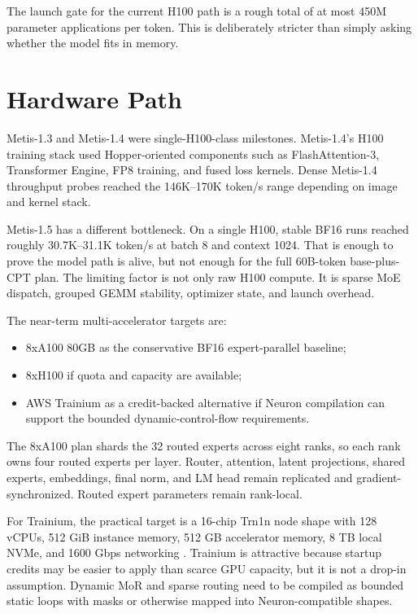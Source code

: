 \documentclass[11pt]{article}
\newcommand{\code}[1]{\texttt{\detokenize{#1}}}
\begin{document}
The launch gate for the current H100 path is a rough total of at most 450M
parameter applications per token. This is deliberately stricter than simply
asking whether the model fits in memory.

\section{Hardware Path}

Metis-1.3 and Metis-1.4 were single-H100-class milestones. Metis-1.4's H100
training stack used Hopper-oriented components such as FlashAttention-3,
Transformer Engine, FP8 training, and fused loss kernels. Dense Metis-1.4
throughput probes reached the 146K--170K token/s range depending on image and
kernel stack.

Metis-1.5 has a different bottleneck. On a single H100, stable BF16
\code{torch_grouped_safe} runs reached roughly 30.7K--31.1K token/s at batch 8
and context 1024. That is enough to prove the model path is alive, but not
enough for the full 60B-token base-plus-CPT plan. The limiting factor is not
only raw H100 compute. It is sparse MoE dispatch, grouped GEMM stability,
optimizer state, and launch overhead.

The near-term multi-accelerator targets are:

\begin{itemize}
  \item 8xA100 80GB as the conservative BF16 expert-parallel baseline;
  \item 8xH100 if quota and capacity are available;
  \item AWS Trainium as a credit-backed alternative if Neuron compilation can
  support the bounded dynamic-control-flow requirements.
\end{itemize}

The 8xA100 plan shards the 32 routed experts across eight ranks, so each rank
owns four routed experts per layer. Router, attention, latent projections,
shared experts, embeddings, final norm, and LM head remain replicated and
gradient-synchronized. Routed expert parameters remain rank-local.

For Trainium, the practical target is a 16-chip Trn1n node shape with 128 vCPUs,
512 GiB instance memory, 512 GB accelerator memory, 8 TB local NVMe, and 1600
Gbps networking \cite{aws-trn1}. Trainium is attractive because startup credits
may be easier to apply than scarce GPU capacity, but it is not a drop-in
assumption. Dynamic MoR and sparse routing need to be compiled as bounded static
loops with masks or otherwise mapped into Neuron-compatible shapes.
\end{document}
